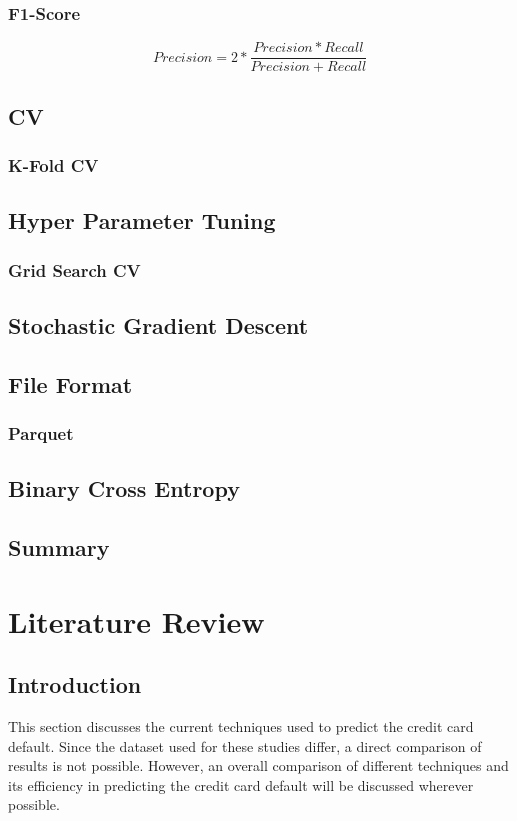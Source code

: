 \documentclass[twoside,11pt,a4paper]{article}
\begin{document}
\subsubsection{F1-Score}
\begin{equation}
		Precision = 2 * \frac{Precision * Recall}{Precision + Recall}
\end{equation}
\subsection{\acf{CV}}
\subsubsection{K-Fold \acs{CV}}
\subsection{Hyper Parameter Tuning}
\subsubsection{Grid Search CV}
\subsection{Stochastic Gradient Descent}
\subsection{File Format}
\subsubsection{Parquet}
\subsection{Binary Cross Entropy}
\subsection{Summary}

\section{Literature Review}\label{sec:literature_review}
\subsection{Introduction}
This section discusses the current techniques used to predict the credit card default. Since the dataset used for these studies differ, a direct comparison of results is not possible. However, an overall comparison of different techniques and its efficiency in predicting the credit card default will be discussed wherever possible.
\end{document}
